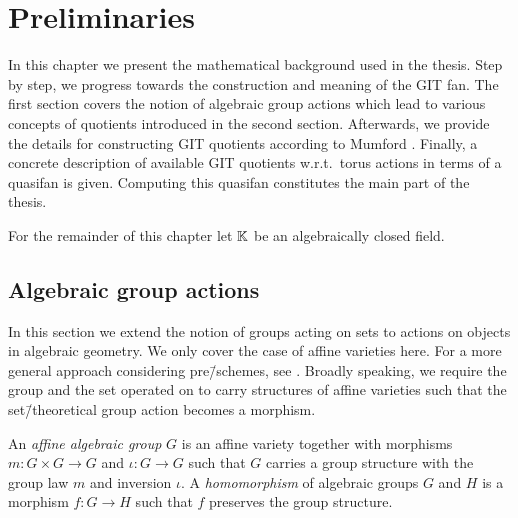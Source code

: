 \chapter{Preliminaries}

In this chapter we present the mathematical background used in the thesis. Step by step, we progress towards the construction and meaning of the GIT fan. The first section covers the notion of algebraic group actions which lead to various concepts of quotients introduced in the second section. Afterwards, we provide the details for constructing GIT quotients according to Mumford \cite{git}. Finally, a concrete description of available GIT quotients w.r.t.\ torus actions in terms of a quasifan is given. Computing this quasifan constitutes the main part of the thesis.

For the remainder of this chapter let $\mathbb{K}$ be an algebraically closed field.


\section{Algebraic group actions}

In this section we extend the notion of groups acting on sets to actions on objects in algebraic geometry. We only cover the case of affine varieties here. For a more general approach considering pre\=/schemes, see \cite{git}. Broadly speaking, we require the group and the set operated on to carry structures of affine varieties such that the set\=/theoretical group action becomes a morphism.

\begin{defi}
	An \emph{affine algebraic group} $G$ is an affine variety together with morphisms $m\colon G \times G \rightarrow G$ and $\iota\colon G \rightarrow G$ such that $G$ carries a group structure with the group law $m$ and inversion $\iota$. A \emph{homomorphism} of algebraic groups $G$ and $H$ is a morphism $f\colon G \rightarrow H$ such that $f$ preserves the group structure.
\end{defi}

